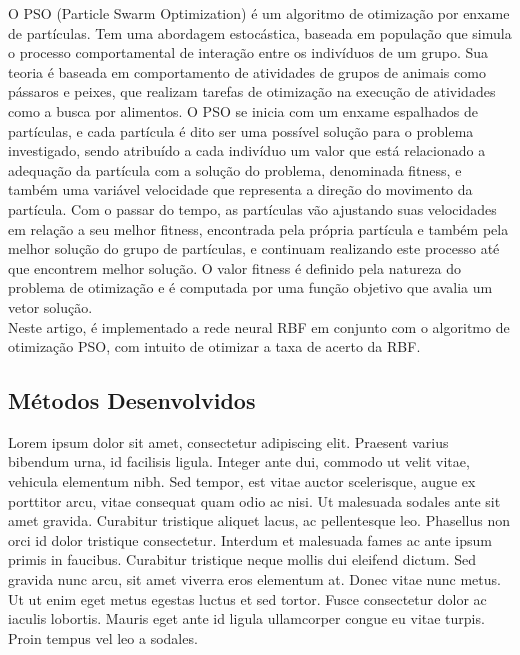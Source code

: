 \documentclass[10pt,twocolumn,letterpaper]{article}
\begin{document}
O PSO (Particle Swarm Optimization) é um algoritmo de otimização por enxame de partículas. Tem uma abordagem estocástica, baseada em população que simula o processo comportamental de interação entre os indivíduos de um grupo. Sua teoria é baseada em comportamento de atividades de grupos de animais como pássaros e peixes, que realizam tarefas de otimização na execução de atividades como a busca por alimentos. O PSO se inicia com um enxame espalhados de partículas, e cada partícula é dito ser uma possível solução para o problema investigado, sendo atribuído a cada indivíduo um valor que está relacionado a adequação da partícula com a solução do problema, denominada fitness, e também uma variável velocidade que representa a direção do movimento da partícula. Com o passar do tempo, as partículas vão ajustando suas velocidades em relação a seu melhor fitness, encontrada pela própria partícula e também pela melhor solução do grupo de partículas, e continuam realizando este processo até que encontrem melhor solução. O valor fitness é definido pela natureza do problema de otimização e é computada por uma função objetivo que avalia um vetor solução. \\

Neste artigo, é implementado a rede neural RBF em conjunto com o algoritmo de otimização PSO, com intuito de otimizar a taxa de acerto da RBF.


\subsection{Métodos Desenvolvidos}

Lorem ipsum dolor sit amet, consectetur adipiscing elit. Praesent varius bibendum urna, id facilisis ligula. Integer ante dui, commodo ut velit vitae, vehicula elementum nibh. Sed tempor, est vitae auctor scelerisque, augue ex porttitor arcu, vitae consequat quam odio ac nisi. Ut malesuada sodales ante sit amet gravida. Curabitur tristique aliquet lacus, ac pellentesque leo. Phasellus non orci id dolor tristique consectetur. Interdum et malesuada fames ac ante ipsum primis in faucibus. Curabitur tristique neque mollis dui eleifend dictum. Sed gravida nunc arcu, sit amet viverra eros elementum at. Donec vitae nunc metus. Ut ut enim eget metus egestas luctus et sed tortor. Fusce consectetur dolor ac iaculis lobortis. Mauris eget ante id ligula ullamcorper congue eu vitae turpis. Proin tempus vel leo a sodales.
\end{document}
